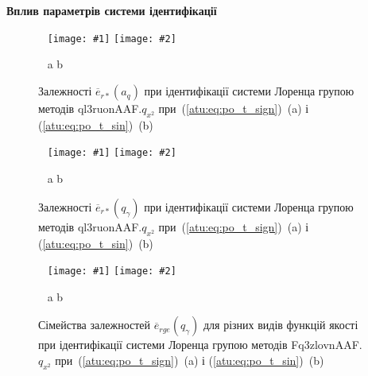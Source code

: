 \documentclass[14pt,handout,utf8]{beamer}
\newcommand{\Xhead}[1]{
 \begin{center}%
      \textbf{#1}%
 \end{center}%
}
\newcommand{\ABlbl}{%
  \vspace{-2.9ex}
  \begin{center}
    ~ \hfill a \hfill\hfill b \hfill ~
  \end{center}
  \vspace{-2.0ex}
}
\newcommand{\PicDouble}[2]{%
 \begin{center}
    ~ \hfill
    \texttt{[image: \#1]}
    \hfill
    \texttt{[image: \#2]}
    \hfill ~
  \end{center}
  \ABlbl
}
\newcommand{\PicDoubleS}[2]{%
 \begin{center}
    ~ \hfill
    \texttt{[image: \#1]}
    \hfill
    \texttt{[image: \#2]}
    \hfill ~
  \end{center}
  \ABlbl
}
\begin{document}
\begin{frame}
  \frametitle{~}

  \Xhead{Вплив параметрів системи ідентифікації}

  \begin{figure}[htb!]
    \PicDouble{../p5/p/cha/lor/ql3ruonAAF/lor_ql3ruonAAF_qx2-p_a_q_e_sign.png}{../p5/p/cha/lor/ql3ruonAAF/lor_ql3ruonAAF_qx2-p_a_q_e_sin.png}
    \caption{Залежності $\overline{e}_{r *}(a_q)$ при ідентифікації системи Лоренца групою методів ql3ruonAAF.$q_{x^2} $ при~(\ref{atu:eq:po_t_sign})~(a) і (\ref{atu:eq:po_t_sin})~(b)}
    \label{atu:f:lor_a_q_ql3ruonAAF.q_x2}
  \end{figure}

  \vspace{-3ex}

  \begin{figure}[htb!]
    \PicDouble{../p5/p/cha/lor/ql3ruonAAF/lor_ql3ruonAAF_qx2-p_qgamma_e_sign.png}{../p5/p/cha/lor/ql3ruonAAF/lor_ql3ruonAAF_qx2-p_qgamma_e_sin.png}
    \caption{Залежності $\overline{e}_{r *}(q_\gamma)$ при ідентифікації системи Лоренца групою методів ql3ruonAAF.$q_{x^2} $ при~(\ref{atu:eq:po_t_sign})~(a) і (\ref{atu:eq:po_t_sin})~(b)}
    \label{atu:f:lor_qg_ql3ruonAAF.q_x2}
  \end{figure}

  \vspace{-3ex}

  \begin{figure}[htb!]
    \PicDoubleS{../p5/p/cha/lor/Fq3zlovnAAF/f_type/lor_Fq3zlovnAAF_qx2_Ft-p_qg_e_all_sign_rge.png}{../p5/p/cha/lor/Fq3zlovnAAF/f_type/lor_Fq3zlovnAAF_qx2_Ft-p_qg_e_all_sin_rge.png}
    \caption{Сімейства залежностей $\overline{e}_{rge}(q_\gamma)$ для різних видів функцій якості при ідентифікації системи Лоренца групою методів Fq3zlovnAAF.$q_{x^2}$ при~(\ref{atu:eq:po_t_sign})~(a) і (\ref{atu:eq:po_t_sin})~(b)}
    \label{atu:f:lor_ftype_rge}
  \end{figure}

\end{frame}



\end{document}
